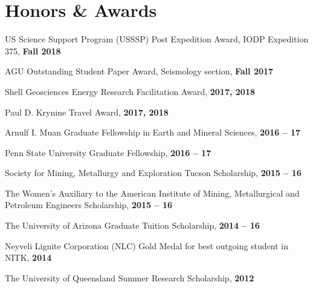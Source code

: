 \documentclass[11pt,letterpaper]{article}
\renewenvironment{itemize}{
  \begin{list}{}{
      \setlength{\leftmargin}{1.5em}
      \setlength{\itemsep}{0.25em}
      \setlength{\parskip}{0pt}
      \setlength{\parsep}{0.25em}
    }
}{
  \end{list}
}
\begin{document}


\section*{Honors \& Awards}
\begin{itemize}
    \item US Science Support Program (USSSP) Post Expedition Award, IODP Expedition 375, {\bf Fall 2018} 
    \item AGU Outstanding Student Paper Award, Seismology section, {\bf Fall 2017}
    \item Shell Geosciences Energy Research Facilitation Award, {\bf 2017, 2018} 
    \item Paul D. Krynine Travel Award, {\bf 2017, 2018}
    \item Arnulf I. Muan Graduate Fellowship in Earth and Mineral Sciences, {\bf 2016 -- 17}
    \item Penn State University Graduate Fellowship, {\bf 2016 -- 17}
    \item Society for Mining, Metallurgy and Exploration Tucson Scholarship, {\bf 2015 -- 16}
    \item The Women's Auxiliary to the American Institute of Mining, Metallurgical and Petroleum Engineers Scholarship, {\bf 2015 -- 16} 
    \item The University of Arizona Graduate Tuition Scholarship, {\bf 2014 -- 16} 
    \item Neyveli Lignite Corporation (NLC) Gold Medal for best outgoing student in NITK, {\bf 2014}
    \item The University of Queensland Summer Research Scholarship, {\bf 2012} 
\end{itemize}


\end{document}
